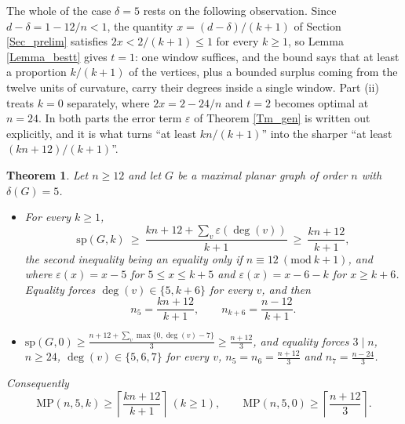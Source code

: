 \documentclass[10pt,a4paper]{article}
\newtheorem{theorem}{Theorem}
\begin{document}
The whole of the case $\delta =5$ rests on the following observation. Since
$d-\delta =1-12/n<1$, the quantity $x=(d-\delta )/(k+1)$ of Section
\ref{Sec_prelim} satisfies $2x<2/(k+1)\leq 1$ for every $k\geq 1$, so Lemma
\ref{Lemma_bestt} gives $t=1$: one window suffices, and the bound says that at
least a proportion $k/(k+1)$ of the vertices, plus a bounded surplus coming from
the twelve units of curvature, carry their degrees inside a single window. Part
(ii) treats $k=0$ separately, where $2x=2-24/n$ and $t=2$ becomes optimal at
$n=24$. In both parts the error term $\varepsilon $ of Theorem \ref{Tm_gen} is
written out explicitly, and it is what turns ``at least $kn/(k+1)$'' into the
sharper ``at least $(kn+12)/(k+1)$''.



\begin{theorem}
\label{Tm_planar}Let $n\geq 12$ and let $G$ be a maximal planar graph of order $n$ with
$\delta (G)=5$.

\begin{itemize}
\item[\textrm{(i)}] For every $k\geq 1$,
\[
\mathrm{sp}(G,k)\ \geq \ \frac{kn+12+\sum_{v}\varepsilon (\deg (v))}{k+1}\ \geq \ \frac{kn+12}{k+1}%
,
\]
the second inequality being an equality only if $n\equiv 12\ (\mathrm{mod}\ k+1)$, and
where $\varepsilon (x)=x-5$ for $5\leq x\leq k+5$ and $\varepsilon (x)=x-6-k$ for $x\geq k+6$.
Equality forces $\deg (v)\in \{5,k+6\}$ for every $v$, and then
\[
n_{5}=\frac{kn+12}{k+1},\qquad n_{k+6}=\frac{n-12}{k+1}.
\]

\item[\textrm{(ii)}] $\displaystyle \mathrm{sp}(G,0)\geq \frac{n+12+\sum_{v}\max \{0,\deg (v)-7\}}%
{3}\geq \frac{n+12}{3}$, and equality forces $3\mid n$, $n\geq 24$, $\deg (v)\in \{5,6,7\}$ for
every $v$, $n_{5}=n_{6}=\frac{n+12}{3}$ and $n_{7}=\frac{n-24}{3}$.
\end{itemize}

Consequently
\[
\mathrm{MP}(n,5,k)\geq \left\lceil \frac{kn+12}{k+1}\right\rceil \ (k\geq 1),\qquad \mathrm{MP}%
(n,5,0)\geq \left\lceil \frac{n+12}{3}\right\rceil .
\]
\end{theorem}
\end{document}
